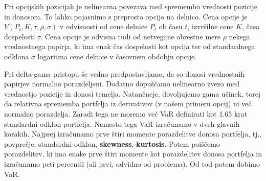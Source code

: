 \documentclass[a4paper, 12pt]{article}
\theoremstyle{definition}
\theoremstyle{plain}
\begin{document}
Pri opcijskih pozicijah je nelinearna povezava med spremembo vrednosti pozicije in donosom. 
To lahko pojasnimo s preprosto opcijo na delnico. Cena opcije je $V(P_t,K,\tau,\rho,\sigma)$ v 
odvisnosti od cene delnice $P_t$ ob času $t$, izvršilne cene $K$, časa dospelosti $\tau$. 
Cena opcije je odvisna tudi od netvegane obrestne mere $\rho$ nekega vrednostnega papirja, ki ima enak
čas dospelosti kot opcija ter od standardnega odklona $\sigma$ logaritma cene delnice v časovnem obdobju opcije.

Pri delta-gama pristopu še vedno predpostavljamo, da so donosi vrednostnih papirjev normalno porazdeljeni. 
Dodatno dopuščamo nelinearno zvezo med vrednostjo pozicije in donosi temelja. Natančneje, dovoljujemo gama učinek,
torej da relativna sprememba portfelja iz derivativov (v našem primeru opcij) ni več normalno porazdelja. 
Zaradi tega ne moremo več VaR definirati kot 1.65 krat standardni odklon portfelja. Namesto tega VaR 
izračunamo v dveh glavnih korakih. Najprej izračunamo prve štiri momente porazdelitve donosa portfelja, tj.,
povprečje, standardni odklon, \textbf{skewness}, \textbf{kurtosis}. Potem poiščemo 
porazdelitev, ki ima enake prve štiri momente kot porazdelitev donosa portfelja in izračunamo peti 
percentil (ali prvi, odvidno od problema). Od tod potem dobimo VaR.
\end{document}
